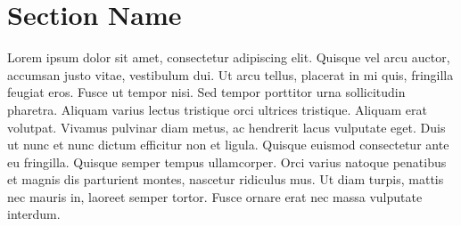 \documentclass{sde-syllabus}
\begin{document}
\maketitle

\section{Section Name}

Lorem ipsum dolor sit amet, consectetur adipiscing elit. Quisque vel arcu auctor, accumsan
justo vitae, vestibulum dui. Ut arcu tellus, placerat in mi quis, fringilla feugiat eros.
Fusce ut tempor nisi. Sed tempor porttitor urna sollicitudin pharetra. Aliquam varius lectus
tristique orci ultrices tristique. Aliquam erat volutpat. Vivamus pulvinar diam metus, ac
hendrerit lacus vulputate eget. Duis ut nunc et nunc dictum efficitur non et ligula.
Quisque euismod consectetur ante eu fringilla. Quisque semper tempus ullamcorper. Orci
varius natoque penatibus et magnis dis parturient montes, nascetur ridiculus mus. Ut
diam turpis, mattis nec mauris in, laoreet semper tortor. Fusce ornare erat nec massa
vulputate interdum.
\end{document}
